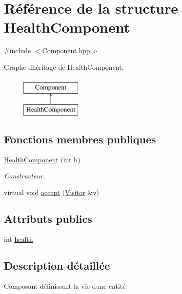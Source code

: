\hypertarget{structHealthComponent}{}\section{Référence de la structure Health\+Component}
\label{structHealthComponent}


{\ttfamily \#include $<$Component.\+hpp$>$}

Graphe d\textquotesingle{}héritage de Health\+Component\+:\begin{figure}[H]
\begin{center}
\leavevmode
\includegraphics[height=2.000000cm]{structHealthComponent}
\end{center}
\end{figure}
\subsection*{Fonctions membres publiques}
\begin{DoxyCompactItemize}
\item 
\hyperlink{structHealthComponent_aeabc12eec0a3f1ba8f966ce068724d16}{Health\+Component} (int h)
\begin{DoxyCompactList}\small\item\em Constructeur. \end{DoxyCompactList}\item 
virtual void \hyperlink{structHealthComponent_a47bb95e02765b03a387366b866046860}{accept} (\hyperlink{classVisitor}{Visitor} \&v)
\end{DoxyCompactItemize}
\subsection*{Attributs publics}
\begin{DoxyCompactItemize}
\item 
int \hyperlink{structHealthComponent_a44675c84af2972a0cee11b9fff5880b5}{health}
\end{DoxyCompactItemize}


\subsection{Description détaillée}
Composant définissant la vie d\textquotesingle{}une entité 

